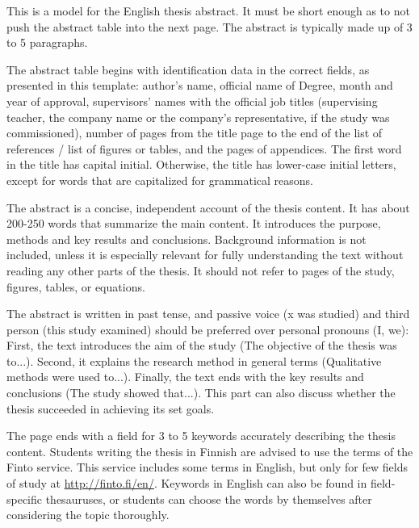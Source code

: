 This is a model for the English thesis abstract.
It must be short enough as to not push the abstract table into the next page.
The abstract is typically made up of 3 to 5 paragraphs.

The abstract table begins with identification data in the correct fields, as presented in this template: author's name, official name of Degree, month and year of approval, supervisors' names with the official job titles (supervising teacher, the company name or the company's representative, if the study was commissioned), number of pages from the title page to the end of the list of references / list of figures or tables, and the pages of appendices.
The first word in the title has capital initial.
Otherwise, the title has lower-case initial letters, except for words that are capitalized for grammatical reasons.

The abstract is a concise, independent account of the thesis content.
It has about 200-250 words that summarize the main content.
It introduces the purpose, methods and key results and conclusions.
Background information is not included, unless it is especially relevant for fully understanding the text without reading any other parts of the thesis.
It should not refer to pages of the study, figures, tables, or equations.

The abstract is written in past tense, and passive voice (x was studied) and third person (this study examined) should be preferred over personal pronouns (I, we): First, the text introduces the aim of the study (The objective of the thesis was to...).
Second, it explains the research method in general terms (Qualitative methods were used to...).
Finally, the text ends with the key results and conclusions (The study showed that...).
This part can also discuss whether the thesis succeeded in achieving its set goals. 

The page ends with a field for 3 to 5 keywords accurately describing the thesis content.
Students writing the thesis in Finnish are advised to use the terms of the Finto service.
This service includes some terms in English, but only for few fields of study at \url{http://finto.fi/en/}.
Keywords in English can also be found in field-specific thesauruses, or students can choose the words by themselves after considering the topic thoroughly.
